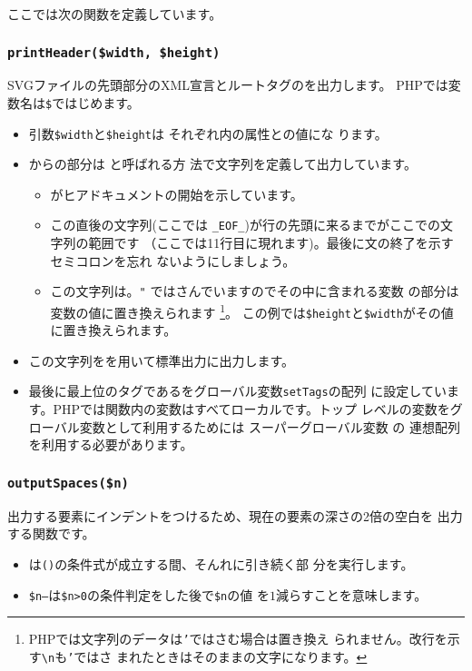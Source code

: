 ここでは次の関数を定義しています。
\subsubsection{\texttt{printHeader(\$width, \$height)}}
SVGファイルの先頭部分のXML宣言とルートタグのを出力します。
PHPでは変数名は\texttt{\$}ではじめます。
\begin{itemize}
 \item 引数\texttt{\$width}と\texttt{\$height}は
       それぞれ内の属性との値にな
       ります。
 \item {}からの部分は
       と呼ばれる方
       法で文字列を定義して出力しています。
\begin{itemize}
\item  \ElmP{<<<}がヒアドキュメントの開始を示しています。
 \item  この直後の文字列(ここでは
       \texttt{\_EOF\_})が行の先頭に来るまでがここでの文字列の範囲です
       （ここでは11行目に現れます)。最後に文の終了を示すセミコロンを忘れ
	ないようにしましょう。
 \item この文字列は。\texttt{"}%
       ではさんでいますのでその中に含まれる変数
       の部分は変数の値に置き換えられます
       \footnote{PHPでは文字列のデータは\texttt{'}ではさむ場合は置き換え
       られません。改行を示す\texttt{\textbackslash n}も\texttt{'}ではさ
       まれたときはそのままの文字になります。}。
       この例では\texttt{\$height}と\texttt{\$width}がその値に置き換えられます。
\end{itemize}
 \item この文字列をを用いて標準出力に出力します。
 \item 最後に最上位のタグであるをグローバル変数\texttt{setTags}の配列
       に設定しています。PHPでは関数内の変数はすべてローカルです。トップ
       レベルの変数をグローバル変数として利用するためには
       {スーパーグローバル変数}
の
       連想配列を利用する必要があります。
\end{itemize}       
\subsubsection{\texttt{outputSpaces(\$n)}}
       出力する要素にインデントをつけるため、現在の要素の深さの2倍の空白を
       出力する関数です。
\begin{itemize}
 \item {}は\texttt{()}の条件式が成立する間、そんれに引き続く部
       分を実行します。
 \item \texttt{\$n--}は\texttt{\$n>0}の条件判定をした後で\texttt{\$n}の値
       を$1$減らすことを意味します。
\end{itemize}
